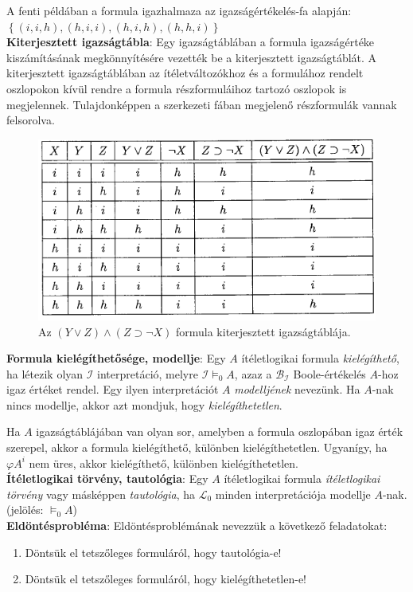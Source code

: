 \documentclass[margin=0px]{article}
\begin{document}
\noindent A fenti példában a formula igazhalmaza az igazságértékelés-fa alapján: $\left\{(i,i,h),(h,i,i),(h,i,h),(h,h,i)\right\}$\\

\noindent \textbf{Kiterjesztett igazságtábla}: Egy igazságtáblában a formula igazságértéke kiszámításának megkönnyítésére vezették
be a kiterjesztett igazságtáblát. A kiterjesztett igazságtáblában az ítéletváltozókhoz és a formulához rendelt oszlopokon kívül rendre
a formula részformuláihoz tartozó oszlopok is megjelennek. Tulajdonképpen a szerkezeti fában megjelenő részformulák vannak felsorolva.

\begin{figure}[H]
    \centering
    \includegraphics[width=0.5\linewidth]{img/kiterjigaztabla}
    \caption{Az $(Y \vee Z) \wedge (Z \supset \neg X)$ formula kiterjesztett igazságtáblája.}
    \label{fig:kiterjigaztabla}
\end{figure}

\noindent \textbf{Formula kielégíthetősége, modellje}: Egy $A$ ítéletlogikai formula \textit{kielégíthető}, ha létezik olyan  $\mathcal{I}$
interpretáció, melyre $\mathcal{I} \models_{0} A$, azaz a $\mathcal{B}_{\mathcal{I}}$ Boole-értékelés $A$-hoz igaz értéket rendel. Egy
ilyen interpretációt $A$ \textit{modelljének} nevezünk. Ha $A$-nak nincs modellje, akkor azt mondjuk, hogy \textit{kielégíthetetlen}.

Ha $A$ igazságtáblájában van olyan sor, amelyben a formula oszlopában igaz érték szerepel, akkor a formula kielégíthető, különben kielégíthetetlen. Ugyanígy, ha $\varphi A^{i}$ nem üres, akkor kielégíthető, különben kielégíthetetlen.\\

\noindent \textbf{Ítéletlogikai törvény, tautológia}: Egy $A$ ítéletlogikai formula \textit{ítéletlogikai törvény} vagy másképpen \textit{tautológia}, ha $\mathcal{L}_{0}$ minden interpretációja modellje $A$-nak. (jelölés: $\models_{0} A$)\\

\noindent \textbf{Eldöntésprobléma}: Eldöntésproblémának nevezzük a következő feladatokat:
\begin{enumerate}
    \item	Döntsük el tetszőleges formuláról, hogy tautológia-e!

    \item	Döntsük el tetszőleges formuláról, hogy kielégíthetetlen-e!
\end{enumerate}
\end{document}
